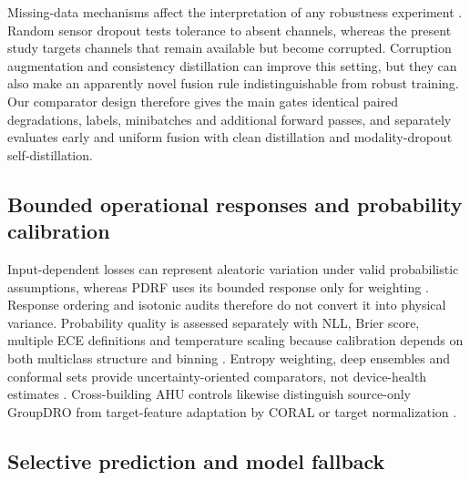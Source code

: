 \documentclass[11pt]{article}
\begin{document}
Missing-data mechanisms affect the interpretation of any robustness experiment \citep{little2019missing}. Random sensor dropout tests tolerance to absent channels, whereas the present study targets channels that remain available but become corrupted. Corruption augmentation and consistency distillation can improve this setting, but they can also make an apparently novel fusion rule indistinguishable from robust training. Our comparator design therefore gives the main gates identical paired degradations, labels, minibatches and additional forward passes, and separately evaluates early and uniform fusion with clean distillation and modality-dropout self-distillation.

\subsection{Bounded operational responses and probability calibration}

Input-dependent losses can represent aleatoric variation under valid probabilistic assumptions, whereas PDRF uses its bounded response only for weighting \citep{kendall2017uncertainties,hullermeier2021uncertainty}. Response ordering and isotonic audits therefore do not convert it into physical variance. Probability quality is assessed separately with NLL, Brier score, multiple ECE definitions and temperature scaling because calibration depends on both multiclass structure and binning \citep{vaicenavicius2019calibration,kull2019dirichlet,mortier2023classifier}. Entropy weighting, deep ensembles and conformal sets provide uncertainty-oriented comparators, not device-health estimates \citep{lakshminarayanan2017ensembles,podkopaev2021distribution}. Cross-building AHU controls likewise distinguish source-only GroupDRO from target-feature adaptation by CORAL or target normalization \citep{sun2016coral,sagawa2020groupdro,mirza2022normalization}.

\subsection{Selective prediction and model fallback}
\end{document}
